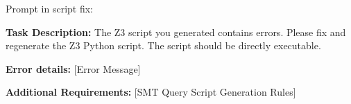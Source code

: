 Prompt in script fix:

\begin{mdframed}
[linecolor=myblue!50,linewidth=2pt,roundcorner=10pt,backgroundcolor=myyellow!20]
\small

\hspace{3.5mm} \textbf{Task Description:} 
The Z3 script you generated contains errors. Please fix and regenerate the Z3 Python script.  The script should be directly executable.

\textbf{Error details:} [Error Message]

\textbf{Additional Requirements:} [SMT Query Script Generation Rules]

\end{mdframed}